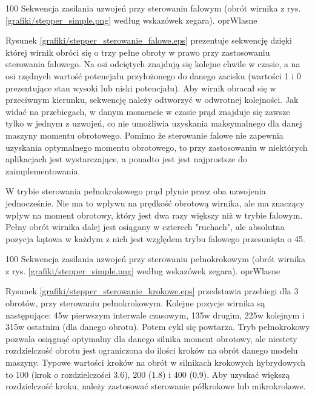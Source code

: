 		{100}
		{Sekwencja zasilania uzwojeń przy sterowaniu falowym (obrót wirnika z rys. \ref{grafiki/stepper_simple.png} według wskazówek zegara).}
		{oprWlasne}

Rysunek \ref{grafiki/stepper_sterowanie_falowe.eps} prezentuje sekwencję dzięki której wirnik obróci się o trzy pełne obroty w prawo przy zastosowaniu sterowania falowego. Na osi odciętych znajdują się kolejne chwile w czasie, a na osi rzędnych wartość potencjału przyłożonego do danego zacisku (wartości 1 i 0 prezentujące stan wysoki lub niski potencjału). Aby wirnik obracał się w przeciwnym kierunku, sekwencję należy odtworzyć w odwrotnej kolejności. Jak widać na przebiegach, w danym momencie w czasie prąd znajduje się zawsze tylko w jednym z uzwojeń, co nie umożliwia uzyskania maksymalnego dla danej maszyny momentu obrotowego. Pomimo że sterowanie falowe nie zapewnia uzyskania optymalnego momentu obrotowego, to przy zastosowaniu w niektórych aplikacjach jest wystarczające, a ponadto jest jest najprostsze do zaimplementowania.

\clearpage


W trybie sterowania pełnokrokowego prąd płynie przez oba uzwojenia jednocześnie. Nie ma to wpływu na prędkość obrotową wirnika, ale ma znaczący wpływ na moment obrotowy, który jest dwa razy większy niż w trybie falowym. Pełny obrót wirnika dalej jest osiągany w czterech "ruchach", ale absolutna pozycja kątowa w każdym z nich jest względem trybu falowego przesunięta o 45\degree.

		{100}
		{Sekwencja zasilania uzwojeń przy sterowaniu pełnokrokowym (obrót wirnika z rys. \ref{grafiki/stepper_simple.png} według wskazówek zegara).}
		{oprWlasne}
		
Rysunek \ref{grafiki/stepper_sterowanie_krokowe.eps} przedstawia przebiegi dla 3 obrotów, przy sterowaniu pełnokrokowym. Kolejne pozycje wirnika są następujące: 45\degree w pierwszym interwale czasowym, 135\degree w drugim, 225\degree w kolejnym i 315\degree w ostatnim (dla danego obrotu). Potem cykl się powtarza. Tryb pełnokrokowy pozwala osiągnąć optymalny dla danego silnika moment obrotowy, ale niestety rozdzielczość obrotu jest ograniczona do ilości kroków na obrót danego modelu maszyny. Typowe wartości kroków na obrót w silnikach krokowych hybrydowych to 100 (krok o rozdzielczości 3.6\degree), 200 (1.8\degree) i 400 (0.9\degree). Aby uzyskać większą rozdzielczość kroku, należy zastosować sterowanie półkrokowe lub mikrokrokowe.

